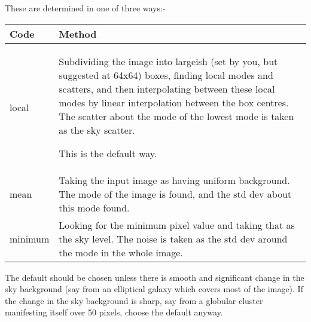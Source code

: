 \begin{small}
{{{ These are determined in one of three ways:-
 
\begin{tabular}{|l|p{4in}|}\hline
 
 Code & Method \\ \hline
 local &
  Subdividing the image into largeish (set by you, but suggested
    at 64x64) boxes, finding local modes and scatters, and then
    interpolating between these local modes by linear interpolation
    between the box centres. The scatter about the
    mode of the lowest mode is taken as the sky scatter.
 
        This is the default way.  \\
 
mean & Taking the input image as having uniform background. The mode of
        the image is found, and the std dev about this mode found. \\
 
minimum &
    Looking for the minimum pixel value and taking that as the sky
    level. The noise is taken as the std dev around the mode in the whole
    image. \\ \hline
\end{tabular}
 
 The default should be chosen unless there is smooth and
 significant change in the sky background (say from an elliptical
 galaxy which covers most of the image). If the
 change in the sky background is sharp, say from a globular cluster
 manifesting itself over 50 pixels, choose the default anyway.
 
}}}
\end{small}
